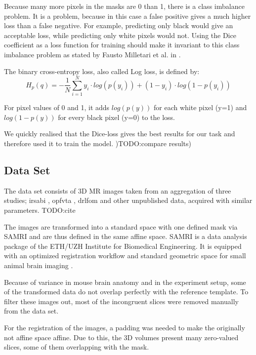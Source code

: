 Because many more pixels in the masks are 0 than 1, there is a class imbalance problem.
It is a problem, because in this case a false positive gives a much higher loss than a false negative.
For example, predicting only black would give an acceptable loss, while predicting only white pixels would not.
Using the Dice coefficient as a loss function for training should make it invariant to this class imbalance problem as stated by Fausto Milletari et al. in \cite{milletari_v-net:_2016}.

The binary cross-entropy loss, also called Log loss, is defined by:
\begin{equation}\label{eq_bincross}
    H_p (q) = -\frac{1}{N} \sum ^N _{i=1} y_i \cdot log(p(y_i))+(1-y_i) \cdot log(1-p(y_i))
\end{equation}

For pixel values of 0 and 1, it adds $log(p(y))$ for each white pixel (y=1) and $log(1-p(y))$ for every black pixel (y=0) to the loss.

We quickly realised that the Dice-loss gives the best results for our task and therefore used it to train the model. )TODO:compare results)


\subsection{Data Set} \label{subsec:Data Set}
The data set consists of 3D MR images taken from an aggregation of three studies; irsabi , opfvta \cite{ioanas_whole-brain_nodate}, drlfom \cite{ioanas_effects_nodate} and other unpublished data, acquired with similar parameters. TODO:cite

The images are transformed into a standard space with one defined mask via SAMRI \cite{noauthor_ibt-fmi/samri_2019} and are thus defined in the same affine space.
SAMRI is a data analysis package of the ETH/UZH Institute for Biomedical Engineering.
It is equipped with an optimized registration workflow and standard geometric space for small animal brain imaging \cite{ioanas_optimized_2019}.

Because of variance in mouse brain anatomy and in the experiment setup, some of the transformed data do not overlap perfectly with the reference template.
To filter these images out, most of the incongruent slices were removed manually from the data set.

For the registration of the images, a padding was needed to make the originally not affine space affine. 
Due to this, the 3D volumes present many zero-valued slices, some of them overlapping with the mask.

